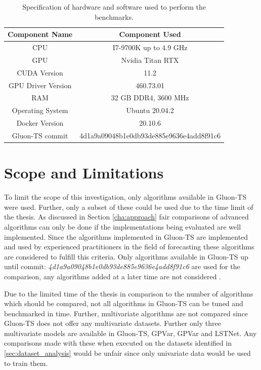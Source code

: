 \begin{table}[htb]
  \centering
  \begin{tabular}{cc}
    \hline
    Component Name     & Component Used                           \\[0.5ex]
    \hline
    CPU                & I7-9700K up to 4.9 GHz                   \\
    GPU                & Nvidia Titan RTX                         \\
    CUDA Version       & 11.2                                     \\
    GPU Driver Version & 460.73.01                                \\
    RAM                & 32 GB DDR4, 3600 MHz                     \\
    Operating System   & Ubuntu 20.04.2                           \\
    Docker Version     & 20.10.6                                  \\
    Gluon-TS commit    & 4d1a9a09048b1e0db93de885e9636e4add8f91c6 \\
  \end{tabular}
  \caption{Specification of hardware and software used to perform the benchmarks.}
  \label{tab:sys_spec}
\end{table}

\section{Scope and Limitations}
To limit the scope of this investigation, only algorithms available in Gluon-TS were used. Further, only a subset of these could be used due to the time limit of the thesis. As discussed in Section \ref{cha:approach} fair comparisons of advanced algorithms can only be done if the implementations being evaluated are well implemented. Since the algorithms implemented in Gluon-TS are implemented and used by experienced practitioners in the field of forecasting these algorithms are considered to fulfill this criteria. Only algorithms available in Gluon-TS up until commit: \textit{4d1a9a09048b1e0db93de885e9636e4add8f91c6} are used for the comparison, any algorithms added at a later time are not considered \cite{gluonts-github}.

Due to the limited time of the thesis in comparison to the number of algorithms which should be compared, not all algorithms in Gluon-TS can be tuned and benchmarked in time. Further, multivariate algorithms are not compared since Gluon-TS does not offer any multivariate datasets. Further only three multivariate models are available in Gluon-TS, GPVar, GPVar and LSTNet. Any comparisons made with these when executed on the datasets identified in \ref{sec:dataset_analysis} would be unfair since only univariate data would be used to train them.

